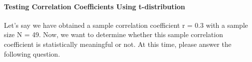 \documentclass{ltjsbook}
\begin{document}
\paragraph{Testing Correlation Coefficients Using t-distribution}
Let's say we have obtained a sample correlation coefficient r = 0.3 with a sample size N = 49. Now, we want to determine whether this sample correlation coefficient is statistically meaningful or not.
At this time, please answer the following question.


\end{document}
